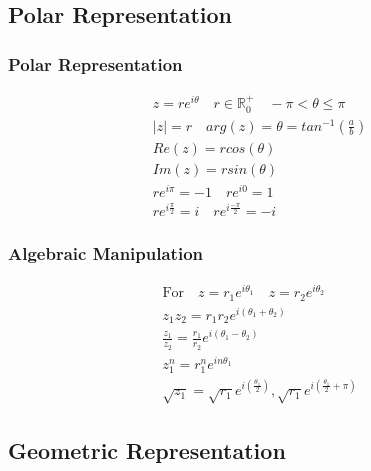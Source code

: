 \documentclass[../main]{subfiles}
\begin{document}
\subsection{Polar Representation}
	
	\subsubsection{Polar Representation}
	\begin{equation*} \begin{gathered}
		z = re^{i\theta} \quad r \in \mathbb{R}^{+}_0 \quad -\pi < \theta \leq \pi \\
		|z| = r \quad arg(z) = \theta = tan^{-1}(\frac{a}{b}) \\
		Re(z) = rcos(\theta) \\ Im(z) = rsin(\theta) \\
		re^{i\pi} = -1 \quad re^{i0} = 1 \\
		re^{i\frac{\pi}{2}} = i \quad re^{i\frac{-\pi}{2}} = -i
	\end{gathered} \end{equation*}
	\subsubsection{Algebraic Manipulation}
	\begin{equation*} \begin{gathered}
		\text{For} \quad z = r_1e^{i\theta_1} \quad z = r_2e^{i\theta_2} \\
		z_1z_2 = r_1r_2 e^{i(\theta_1+\theta_2)} \\
		\frac{z_1}{z_2} = \frac{r_1}{r_2} e^{i(\theta_1-\theta_2)} \\
		z_1^n = r_1^n e^{in\theta_1} \\
		\sqrt{z_1} = \sqrt{r_1} e^{i(\frac{\theta_1}{2})}, \sqrt{r_1} e^{i(\frac{\theta_1}{2}+\pi)}
	\end{gathered} \end{equation*}

\subsection{Geometric Representation}
	
\end{document}
